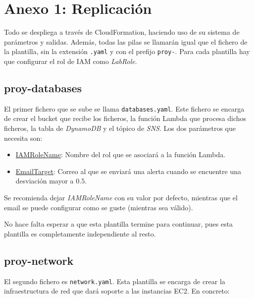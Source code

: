 \section{Anexo 1: Replicación}

Todo se despliega a través de CloudFormation, haciendo uso de su sistema de parámetros y salidas. Además, todas las pilas se llamarán igual que el fichero de la plantilla, sin la extensión \texttt{.yaml} y con el prefijo \texttt{proy-}. Para cada plantilla hay que configurar el rol de IAM como \textit{LabRole}.

\subsection{proy-databases}

El primer fichero que se sube se llama \texttt{databases.yaml}. Este fichero se encarga de crear el bucket que recibe los ficheros, la función Lambda que procesa dichos ficheros, la tabla de \textit{DynamoDB} y el tópico de \textit{SNS}. Los dos parámetros que necesita son:

\begin{itemize}
     \item \underline{IAMRoleName}: Nombre del rol que se asociará a la función Lambda.
     \item \underline{EmailTarget}: Correo al que se enviará una alerta cuando se encuentre una desviación mayor a $0.5$.
\end{itemize}

Se recomienda dejar \textit{IAMRoleName} con su valor por defecto, mientras que el email se puede configurar como se guste (mientras sea válido).

No hace falta esperar a que esta plantilla termine para continuar, pues esta plantilla es completamente independiente al resto.

\subsection{proy-network}

El segundo fichero es \texttt{network.yaml}. Esta plantilla se encarga de crear la infraestructura de red que dará soporte a las instancias EC2. En concreto:


